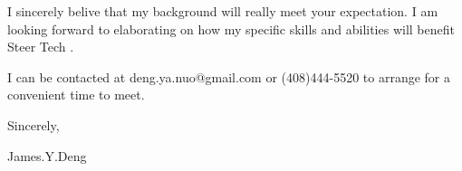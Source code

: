 { \bigbreak } 
I sincerely belive that my background will really meet your expectation.
I am looking forward to elaborating on how my specific skills and abilities will benefit Steer Tech .

{ \bigbreak } 
I can be contacted at deng.ya.nuo@gmail.com
or (408)444-5520 to arrange for a convenient time to meet.

{ \bigbreak } 




\vskip 60pt

{ \bigbreak } 
Sincerely,

James.Y.Deng

\bye
